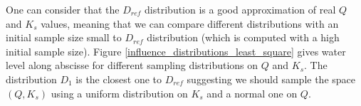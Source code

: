 One can consider that the $D_{ref}$ distribution is a good approximation of real $Q$ and $K_s$ values, meaning that we can compare different distributions with an initial sample size small to $D_{ref}$ distribution (which is computed with a high initial sample size). Figure \ref{influence_distributions_least_square} gives water level along abscisse for different sampling distributions on $Q$ and $K_s$. The distribution $D_1$ is the closest one to $D_{ref}$ suggesting we should sample the space $(Q,K_s)$ using a uniform distribution on $K_s$ and a normal one on $Q$.